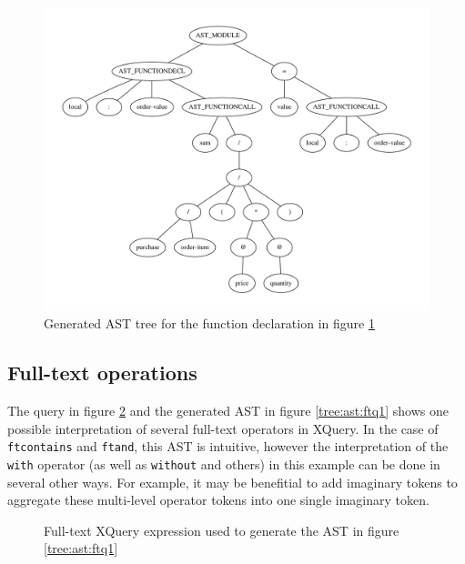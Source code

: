 \begin{figure}[h!]
\centering
 \includegraphics[width=1\textwidth]{img/graphs/funcdecl1}
\caption{Generated AST tree for the function declaration in figure \ref{tree:ast:funcdecl1}}
\label{tree:ast:funcdecl1}
\end{figure}

\subsection{Full-text operations}
The query in figure \ref{code:xq:ftq1} and the generated AST in figure
\ref{tree:ast:ftq1} shows one possible interpretation of several full-text 
operators in XQuery. In the case of \verb!ftcontains! and \verb!ftand!, this AST
is intuitive, however the interpretation of the \verb!with! operator (as well
as \verb!without! and others) in this example can be done in several other ways.
For example, it may be benefitial to add imaginary tokens to aggregate these
multi-level operator tokens into one single imaginary token.

\begin{figure}[h!]

\caption{Full-text XQuery expression used to generate the AST in figure
\ref{tree:ast:ftq1}}
\label{code:xq:ftq1}
\end{figure}

